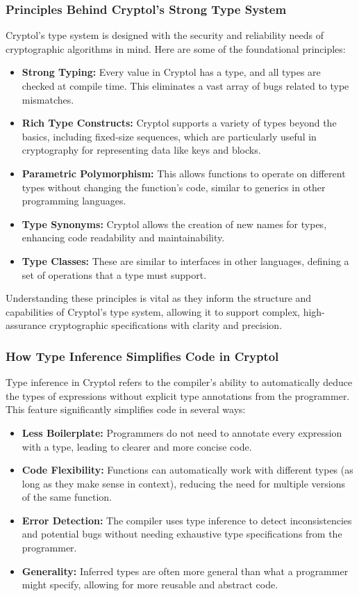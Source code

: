 \subsubsection{Principles Behind Cryptol's Strong Type System}
Cryptol's type system is designed with the security and reliability needs of cryptographic algorithms in mind. Here are some of the foundational principles:

\begin{itemize}
	\item \textbf{Strong Typing:} Every value in Cryptol has a type, and all types are checked at compile time. This eliminates a vast array of bugs related to type mismatches.
	\item \textbf{Rich Type Constructs:} Cryptol supports a variety of types beyond the basics, including fixed-size sequences, which are particularly useful in cryptography for representing data like keys and blocks.
	\item \textbf{Parametric Polymorphism:} This allows functions to operate on different types without changing the function's code, similar to generics in other programming languages.
	\item \textbf{Type Synonyms:} Cryptol allows the creation of new names for types, enhancing code readability and maintainability.
	\item \textbf{Type Classes:} These are similar to interfaces in other languages, defining a set of operations that a type must support.
\end{itemize}

Understanding these principles is vital as they inform the structure and capabilities of Cryptol’s type system, allowing it to support complex, high-assurance cryptographic specifications with clarity and precision.

\subsubsection{How Type Inference Simplifies Code in Cryptol}
Type inference in Cryptol refers to the compiler's ability to automatically deduce the types of expressions without explicit type annotations from the programmer. This feature significantly simplifies code in several ways:

\begin{itemize}
	\item \textbf{Less Boilerplate:} Programmers do not need to annotate every expression with a type, leading to clearer and more concise code.
	\item \textbf{Code Flexibility:} Functions can automatically work with different types (as long as they make sense in context), reducing the need for multiple versions of the same function.
	\item \textbf{Error Detection:} The compiler uses type inference to detect inconsistencies and potential bugs without needing exhaustive type specifications from the programmer.
	\item \textbf{Generality:} Inferred types are often more general than what a programmer might specify, allowing for more reusable and abstract code.
\end{itemize}

